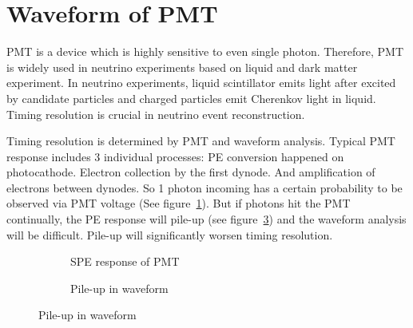 \section{Waveform of PMT} %
PMT is a device which is highly sensitive to even single photon. Therefore, PMT is widely used in neutrino experiments based on liquid and dark matter experiment. In neutrino experiments, liquid scintillator emits light after excited by candidate particles and charged particles emit Cherenkov light in liquid. Timing resolution is crucial in neutrino event reconstruction. 

Timing resolution is determined by PMT and waveform analysis. Typical PMT response includes 3 individual processes: PE conversion happened on photocathode. Electron collection by the first dynode. And amplification of electrons between dynodes. So 1 photon incoming has a certain probability to be observed via PMT voltage (See figure~\ref{fig:spe}). But if photons hit the PMT continually, the PE response will pile-up (see figure~\ref{fig:pile}) and the waveform analysis will be difficult. Pile-up will significantly worsen timing resolution. 

\begin{figure}[H]
\begin{minipage}[b]{.5\textwidth}
\begin{figure}[H]
    \centering
    \resizebox{\textwidth}{!}{}
    \caption{\label{fig:spe} SPE response of PMT}
\end{figure}
\end{minipage}
\begin{minipage}[b]{.5\textwidth}
\begin{figure}[H]
    \centering
    \resizebox{\textwidth}{!}{}
    \caption{\label{fig:pile} Pile-up in waveform}
\end{figure}
\end{minipage}
\end{figure}


